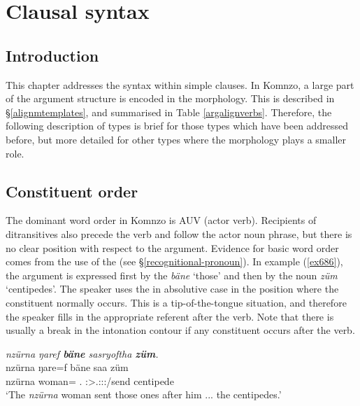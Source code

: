 
\chapter{Clausal syntax} \label{cha:clausalsyntax}

\section{Introduction}

This chapter addresses the syntax within simple clauses. In Komnzo, a large part of the argument structure is encoded in the  morphology. This is described in \S{}\ref{alignmtemplates}, and summarised in Table \ref{argalignverbs}. Therefore, the following description of  types is brief for those types which have been addressed before, but more detailed for other types where the  morphology plays a smaller role.

\section{Constituent order}\label{constitorder}

The dominant word order in Komnzo is AUV (actor  verb). Recipients of ditransitives also precede the verb and follow the actor noun phrase, but there is no clear position with respect to the  argument. Evidence for basic word order comes from the use of the   (see \S{}\ref{recognitional-pronoun}). In example (\ref{ex686}), the  argument is expressed first by the  \emph{bäne} `those' and then by the noun \emph{züm} `centipedes'. The speaker uses the  in absolutive case in the position where the constituent normally occurs. This is a tip-of-the-tongue situation, and therefore the speaker fills in the appropriate referent after the verb. Note that there is usually a break in the intonation contour if any constituent occurs after the verb.

\begin{exe}
	\ex \emph{nzürna ŋaref \textbf{bäne} sasryoftha \textbf{züm}.}\\
	\gll nzürna ŋare=f bäne saa züm\\
	nzürna woman=\Erg{} \Recog.\Abs{} \Sg:\Sbj>\Tsg.\Masc:\Io:\Pst:\Pfv/send centipede\\
	\trans `The \emph{nzürna} woman sent those ones after him ... the centipedes.'\\
	\label{ex686}
\end{exe}

